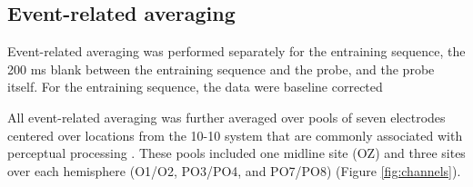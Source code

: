 \documentclass[../dwyatte_dissertation.tex]{subfiles}
\begin{document}
\subsection{Event-related averaging}
Event-related averaging was performed separately for the entraining sequence, the 200 ms blank between the entraining sequence and the probe, and the probe itself. For the entraining sequence, the data were baseline corrected

All event-related averaging was further averaged over pools of seven electrodes centered over locations from the 10-10 system that are commonly associated with perceptual processing \cite[e.g.,]{DohertyRaoMesulamEtAl05,RohenkohlNobre11}. These pools included one midline site (OZ) and three sites over each hemisphere (O1/O2, PO3/PO4, and PO7/PO8) (Figure \ref{fig:channels}).

\end{document}
